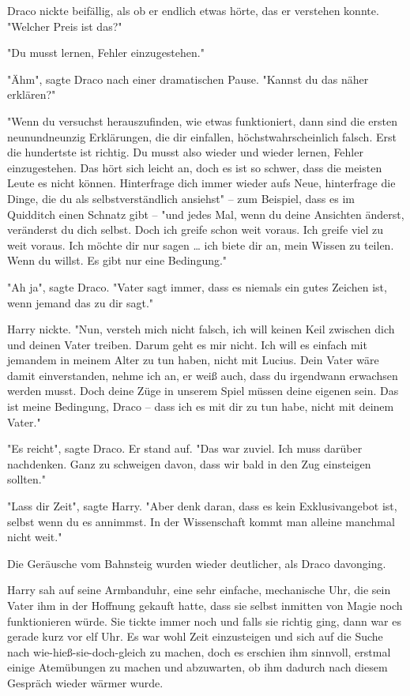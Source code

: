 {Draco nickte beifällig, als ob er endlich etwas hörte, das er verstehen konnte. "Welcher Preis ist das?"

"Du musst lernen, Fehler einzugestehen."

"Ähm", sagte Draco nach einer dramatischen Pause. "Kannst du das näher erklären?"

"Wenn du versuchst herauszufinden, wie etwas funktioniert, dann sind die ersten neunundneunzig Erklärungen, die dir einfallen, höchstwahrscheinlich falsch. Erst die hundertste ist richtig. Du musst also wieder und wieder lernen, Fehler einzugestehen. Das hört sich leicht an, doch es ist so schwer, dass die meisten Leute es nicht können. Hinterfrage dich immer wieder aufs Neue, hinterfrage die Dinge, die du als selbstverständlich ansiehst" -- zum Beispiel, dass es im Quidditch einen Schnatz gibt -- "und jedes Mal, wenn du deine Ansichten änderst, veränderst du dich selbst. Doch ich greife schon weit voraus. Ich greife viel zu weit voraus. Ich möchte dir nur sagen … ich biete dir an, mein Wissen zu teilen. Wenn du willst. Es gibt nur eine Bedingung."

"Ah ja", sagte Draco. "Vater sagt immer, dass es niemals ein gutes Zeichen ist, wenn jemand das zu dir sagt."

Harry nickte. "Nun, versteh mich nicht falsch, ich will keinen Keil zwischen dich und deinen Vater treiben. Darum geht es mir nicht. Ich will es einfach mit jemandem in meinem Alter zu tun haben, nicht mit Lucius. Dein Vater wäre damit einverstanden, nehme ich an, er weiß auch, dass du irgendwann erwachsen werden musst. Doch deine Züge in unserem Spiel müssen deine eigenen sein. Das ist meine Bedingung, Draco -- dass ich es mit dir zu tun habe, nicht mit deinem Vater."

"Es reicht", sagte Draco. Er stand auf. "Das war zuviel. Ich muss darüber nachdenken. Ganz zu schweigen davon, dass wir bald in den Zug einsteigen sollten."

"Lass dir Zeit", sagte Harry. "Aber denk daran, dass es kein Exklusivangebot ist, selbst wenn du es annimmst. In der Wissenschaft kommt man alleine manchmal nicht weit."

Die Geräusche vom Bahnsteig wurden wieder deutlicher, als Draco davonging.

Harry sah auf seine Armbanduhr, eine sehr einfache, mechanische Uhr, die sein Vater ihm in der Hoffnung gekauft hatte, dass sie selbst inmitten von Magie noch funktionieren würde. Sie tickte immer noch und falls sie richtig ging, dann war es gerade kurz vor elf Uhr. Es war wohl Zeit einzusteigen und sich auf die Suche nach wie-hieß-sie-doch-gleich zu machen, doch es erschien ihm sinnvoll, erstmal einige Atemübungen zu machen und abzuwarten, ob ihm dadurch nach diesem Gespräch wieder wärmer wurde.

}
